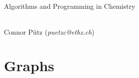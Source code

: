 \documentclass[a4paper,11pt]{scrartcl}
\begin{document}
\thispagestyle{empty}

\begin{center}
\begin{LARGE}\sectfont
Algorithms and Programming in Chemistry
\end{LARGE}\\\vspace{0.5cm}
Connor Pütz (\textit{puetzc@ethz.ch})
\\\vspace{1cm}
\end{center}

\tableofcontents





\newpage\section{Graphs}





\end{document}
